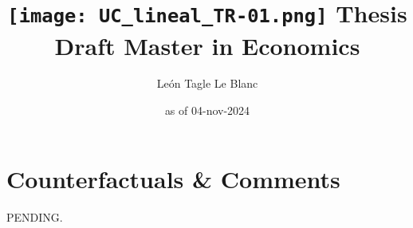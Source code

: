 \documentclass[11pt]{article}
\title{\texttt{[image: UC\_lineal\_TR-01.png]} \linebreak \linebreak 
Thesis Draft \linebreak Master in Economics}
\author{León Tagle Le Blanc}
\date{as of 04-nov-2024}
\begin{document}
\begin{titlepage}
\maketitle
\thispagestyle{empty}

\newpage
\tableofcontents
\setcounter{page}{0}
\thispagestyle{empty}
\end{titlepage}















\section{Counterfactuals \& Comments}

PENDING.

\newpage





\newpage


\end{document}

